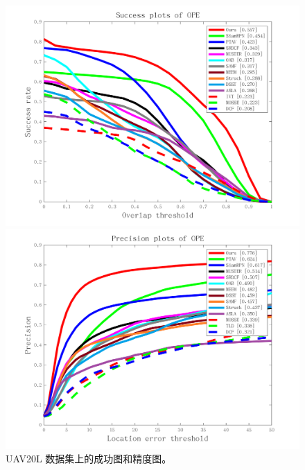 \begin{figure}[htb]
\begin{minipage}[b]{0.5\linewidth}
  \centering
  \centerline{\includegraphics[width=1.0\textwidth]{Img/globally/UAV20L/quality_plot_overlap_OPE_AUC.png}}
\end{minipage}
\hfill
\begin{minipage}[b]{0.5\linewidth}
  \centering
  \centerline{\includegraphics[width=1.0\textwidth]{Img/globally/UAV20L/quality_plot_error_OPE_threshold.png}}
\end{minipage}
%
\caption{UAV20L 数据集上的成功图和精度图。}
\label{fig:uav20l}
%
\end{figure}

